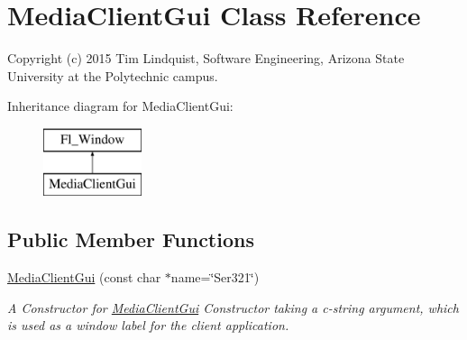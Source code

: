 \hypertarget{class_media_client_gui}{}\section{Media\+Client\+Gui Class Reference}
\label{class_media_client_gui}


Copyright (c) 2015 Tim Lindquist, Software Engineering, Arizona State University at the Polytechnic campus.  


Inheritance diagram for Media\+Client\+Gui\+:\begin{figure}[H]
\begin{center}
\leavevmode
\includegraphics[height=2.000000cm]{class_media_client_gui}
\end{center}
\end{figure}
\subsection*{Public Member Functions}
\begin{DoxyCompactItemize}
\item 
\hyperlink{class_media_client_gui_a73eeabbba329bd1b7f558d65e0c3eab3}{Media\+Client\+Gui} (const char $\ast$name=\char`\"{}Ser321\char`\"{})
\begin{DoxyCompactList}\small\item\em A Constructor for \hyperlink{class_media_client_gui}{Media\+Client\+Gui} Constructor taking a c-\/string argument, which is used as a window label for the client application. \end{DoxyCompactList}\end{DoxyCompactItemize}

